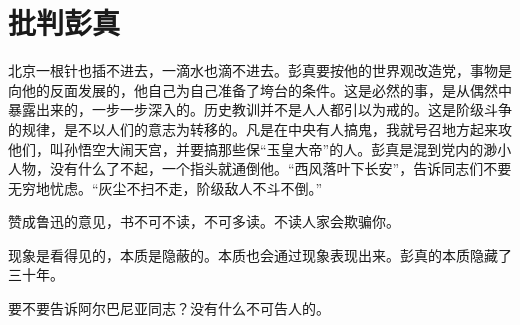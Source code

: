 \section[批判彭真（对康生同志讲话）（一九六六年四月二十八日至二十九日）]{批判彭真}


北京一根针也插不进去，一滴水也滴不进去。彭真要按他的世界观改造党，事物是向他的反面发展的，他自己为自己准备了垮台的条件。这是必然的事，是从偶然中暴露出来的，一步一步深入的。历史教训并不是人人都引以为戒的。这是阶级斗争的规律，是不以人们的意志为转移的。凡是在中央有人搞鬼，我就号召地方起来攻他们，叫孙悟空大闹天宫，并要搞那些保“玉皇大帝”的人。彭真是混到党内的渺小人物，没有什么了不起，一个指头就通倒他。“西风落叶下长安”，告诉同志们不要无穷地忧虑。“灰尘不扫不走，阶级敌人不斗不倒。”

赞成鲁迅的意见，书不可不读，不可多读。不读人家会欺骗你。

现象是看得见的，本质是隐蔽的。本质也会通过现象表现出来。彭真的本质隐藏了三十年。

要不要告诉阿尔巴尼亚同志？没有什么不可告人的。

